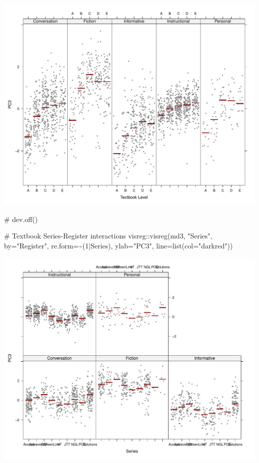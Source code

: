 \documentclass[
  letterpaper,
  DIV=11,
  numbers=noendperiod]{scrreprt}
\newenvironment{Shaded}{\begin{snugshade}}{\end{snugshade}}
\newcommand{\AttributeTok}[1]{\textcolor[rgb]{0.40,0.45,0.13}{#1}}
\newcommand{\CommentTok}[1]{\textcolor[rgb]{0.37,0.37,0.37}{#1}}
\newcommand{\DecValTok}[1]{\textcolor[rgb]{0.68,0.00,0.00}{#1}}
\newcommand{\FunctionTok}[1]{\textcolor[rgb]{0.28,0.35,0.67}{#1}}
\newcommand{\NormalTok}[1]{\textcolor[rgb]{0.00,0.23,0.31}{#1}}
\newcommand{\SpecialCharTok}[1]{\textcolor[rgb]{0.37,0.37,0.37}{#1}}
\newcommand{\StringTok}[1]{\textcolor[rgb]{0.13,0.47,0.30}{#1}}
\begin{document}
\includegraphics{AppendixF_files/figure-pdf/Dim3comparisons-1.pdf}

\begin{Shaded}
\begin{Highlighting}[]
\CommentTok{\# dev.off()}

\CommentTok{\# Textbook Series{-}Register interactions}
\NormalTok{visreg}\SpecialCharTok{::}\FunctionTok{visreg}\NormalTok{(md3, }\StringTok{"Series"}\NormalTok{, }\AttributeTok{by=}\StringTok{"Register"}\NormalTok{, }\AttributeTok{re.form=}\SpecialCharTok{\textasciitilde{}}\NormalTok{(}\DecValTok{1}\SpecialCharTok{|}\NormalTok{Series),}
               \AttributeTok{ylab=}\StringTok{"PC3"}\NormalTok{, }\AttributeTok{line=}\FunctionTok{list}\NormalTok{(}\AttributeTok{col=}\StringTok{"darkred"}\NormalTok{))}
\end{Highlighting}
\end{Shaded}

\includegraphics{AppendixF_files/figure-pdf/Dim3comparisons-2.pdf}
\end{document}
